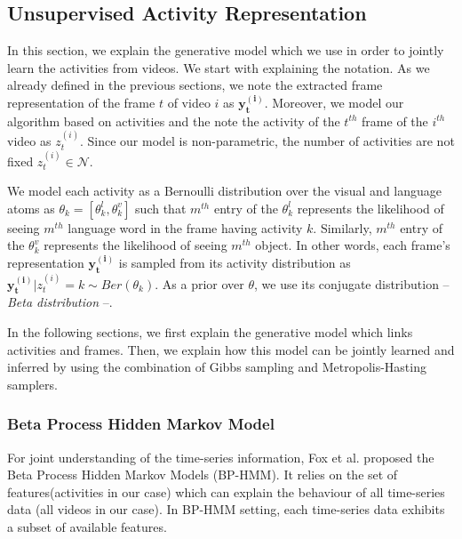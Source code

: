 \subsection{Unsupervised Activity Representation}
\label{basics}
In this section, we explain the generative model which we use in order to jointly learn the activities from videos. We start with explaining the notation. As we already defined in the previous sections, we note the extracted frame representation of the frame $t$ of video $i$ as $\mathbf{y^{(i)}_t}$. Moreover, we model our algorithm based on activities and the note the activity of the $t^{th}$ frame of the $i^{th}$ video as $z^{(i)}_t$. Since our model is non-parametric, the number of activities are not fixed \ie  $z^{(i)}_t \in \mathcal{N}$.


We model each activity as a Bernoulli distribution over the visual and language atoms as $\theta_k=[\theta_k^l,\theta_k^v]$ such that $m^{th}$ entry of the $\theta_k^l$ represents the likelihood of seeing $m^{th}$ language word in the frame having activity $k$. Similarly, $m^{th}$ entry of the $\theta_k^v$ represents the likelihood of seeing $m^{th}$ object. In other words, each frame's representation $\mathbf{y^{(i)}_t}$ is sampled from its activity distribution as \mbox{$\mathbf{y^{(i)}_t}|z^{(i)}_t=k \sim Ber(\theta_k)$}. As a prior over $\theta$, we use its conjugate distribution -- \emph{Beta distribution} --.

In the following sections, we first explain the generative model which links activities and frames. Then, we explain how this model can be jointly learned and inferred by using the combination of Gibbs sampling and Metropolis-Hasting samplers.
\subsubsection{Beta Process Hidden Markov Model}
For joint understanding of the time-series information, Fox et al.\cite{foxBPHMM} proposed the Beta Process Hidden Markov Models (BP-HMM). It relies on the set of features(activities in our case) which can explain the behaviour of all time-series data (all videos in our case). In BP-HMM setting, each time-series data exhibits a subset of available features.

